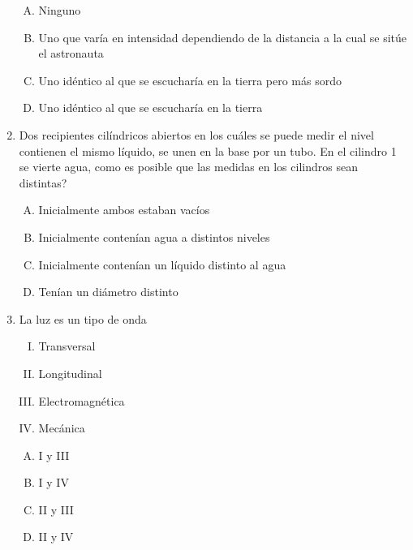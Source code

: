 \begin{enumerate}
\begin{enumerate}[(A)]
\item Ninguno
\item Uno que varía en intensidad dependiendo de la distancia a la cual se sitúe el astronauta
\item Uno idéntico al que se escucharía en la tierra pero más sordo 
\item Uno idéntico al que se escucharía en la tierra 
\end{enumerate}

\item Dos recipientes cilíndricos abiertos en los cuáles se puede medir el nivel contienen el mismo líquido, se unen en la base por un tubo. En el cilindro 1 se vierte agua, como es posible que las medidas en los cilindros sean distintas? \label{dia-24}

\begin{enumerate}[(A)]
\item Inicialmente ambos estaban vacíos
\item Inicialmente contenían agua a distintos niveles
\item Inicialmente contenían un líquido distinto al agua
\item Tenían un diámetro distinto 
\end{enumerate}


\item La luz es un tipo de onda \label{dia-25}
\begin{enumerate}[I.]
\item Transversal
\item Longitudinal
\item Electromagnética
\item Mecánica
\end{enumerate}


\begin{enumerate}[(A)]
\item I y III
\item I y IV
\item II y III
\item II y IV
\end{enumerate}



\end{enumerate}

